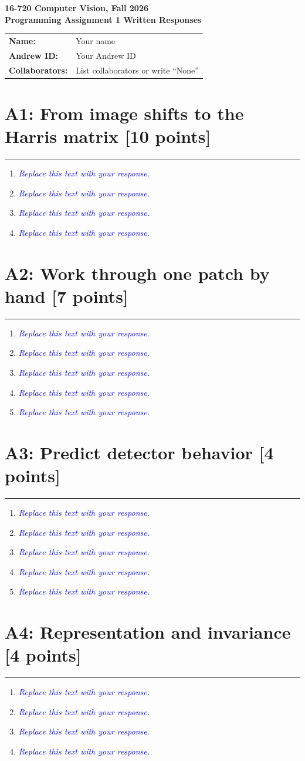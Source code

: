 \documentclass[11pt]{article}
\newcommand{\studentname}{Your name}
\newcommand{\andrewid}{Your Andrew ID}
\newcommand{\collaborators}{List collaborators or write ``None''}
\newcommand{\response}{%
  \textcolor{blue}{\emph{Replace this text with your response.}}%
}
\newcommand{\problemheading}[3]{%
  \section*{#1: #2 \hfill [#3 points]}
  \label{pa1:#1}
  \hrule
  \vspace{0.5em}
}
\newcommand{\nextproblem}[3]{%
  \clearpage
  \problemheading{#1}{#2}{#3}
}
\begin{document}
\begin{center}
  {\Large\bfseries 16-720 Computer Vision, Fall 2026}\\[0.35em]
  {\large\bfseries Programming Assignment 1 Written Responses}
\end{center}

\begin{tabular}{@{}ll@{}}
\textbf{Name:} & \studentname \\
\textbf{Andrew ID:} & \andrewid \\
\textbf{Collaborators:} & \collaborators
\end{tabular}

\problemheading{A1}{From image shifts to the Harris matrix}{10}

\begin{enumerate}[label=\textbf{A1.\arabic*.}]
  \item \response
  \item \response
  \item \response
  \item \response
\end{enumerate}

\nextproblem{A2}{Work through one patch by hand}{7}

\begin{enumerate}[label=\textbf{A2.\arabic*.}]
  \item \response
  \item \response
  \item \response
  \item \response
  \item \response
\end{enumerate}

\nextproblem{A3}{Predict detector behavior}{4}

\begin{enumerate}[label=\textbf{A3.\arabic*.}]
  \item \response
  \item \response
  \item \response
  \item \response
  \item \response
\end{enumerate}

\nextproblem{A4}{Representation and invariance}{4}

\begin{enumerate}[label=\textbf{A4.\arabic*.}]
  \item \response
  \item \response
  \item \response
  \item \response
\end{enumerate}
\end{document}
